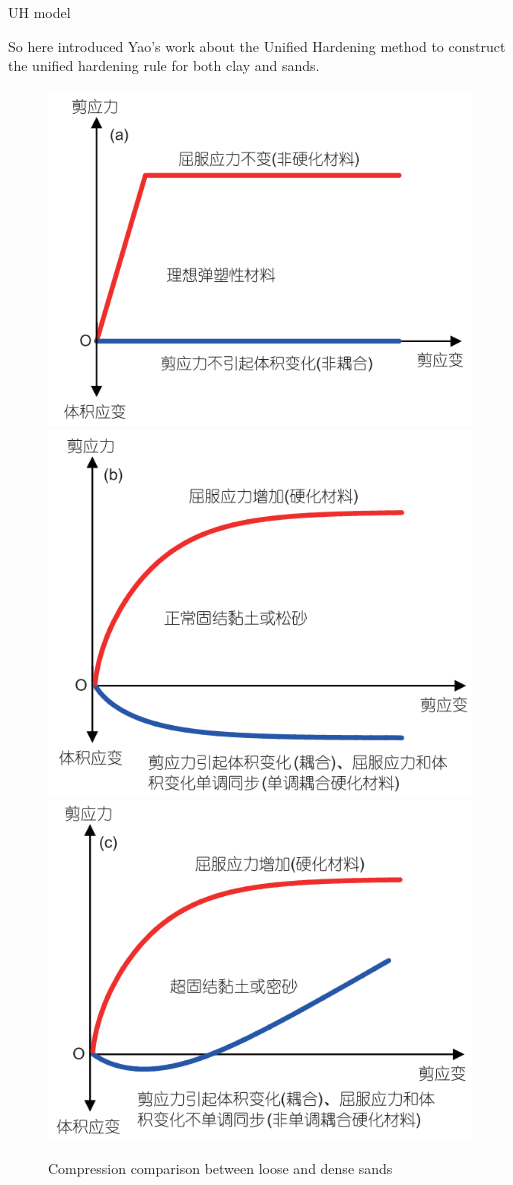 \documentclass[aspectratio=169]{beamer}
\begin{document}
\begin{frame}{UH model}
\begin{minipage}{0.58\linewidth}
        \vspace{2mm}
        So here introduced Yao's work about the Unified Hardening method to construct the unified hardening rule for both clay and sands\cite{Yao2019}.
    \end{minipage}
    \hspace{2mm}
    \begin{minipage}{0.38\linewidth}
        \begin{figure}
            \centering
            \includegraphics[width=0.48\linewidth]{./pic/ideal elastic-plastic material.jpg}
            \includegraphics[width=0.48\linewidth]{./pic/dense sand or clay.jpg}
            \includegraphics[width=0.55\linewidth]{./pic/dense sand.jpg}
            \caption{Compression comparison between loose and dense sands}
            \label{fig: sand and clay compression}
        \end{figure}
    \end{minipage}
\end{frame}
\end{document}
